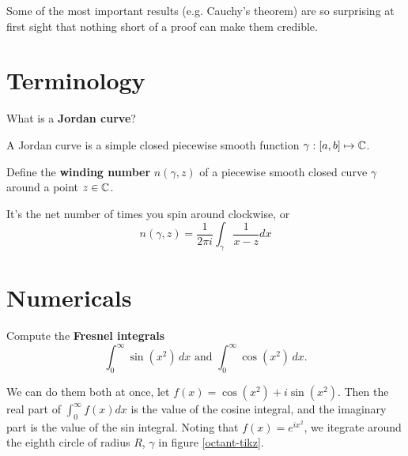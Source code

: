 \documentclass{homework}
\author{Alex Li}
\begin{document}
\maketitle

\begin{inspiration}
Some of the most important results (e.g. Cauchy's theorem) are so surprising at first sight that nothing short of a proof can make them credible.
\end{inspiration}

\section{Terminology}

\begin{problem}
  What is a \textbf{Jordan curve}?
  \end{problem}
  \begin{solution}
  A Jordan curve is a simple closed piecewise smooth function $\gamma:[a,b]\mapsto \mathbb{C}$.
  \end{solution}
  \begin{problem}
    Define the \textbf{winding number} $n(\gamma,z)$ of a piecewise
      smooth closed curve $\gamma$ around a point $z \in \mathbb{C}$.
      \end{problem}
      \begin{solution}
      It's the net number of times you spin around clockwise, or
      \[n(\gamma, z) = \frac{1}{2\pi i}\int_\gamma \frac{1}{x-z}dx \]

      \end{solution}
      \section{Numericals}

      \begin{problem}\label{Fresnel integral}
      Compute the \textbf{Fresnel integrals}
        \[
            \int_0^\infty \sin \left( x^2 \right) \, dx \mbox{ and } \int_0^\infty \cos \left( x^2 \right) \, dx.
              \]
              \end{problem}
              We can do them both at once, let $f(x) = \cos(x^2) + i\sin(x^2)$. Then the real part of $\int_0^\infty f(x)dx$ is the value of the cosine integral, and the imaginary part is the value of the sin integral. Noting that $f(x) = e^{ix^2}$, we itegrate around the eighth circle of radius $R$, $\gamma$ in figure \ref{octant-tikz}. 
\end{document}
